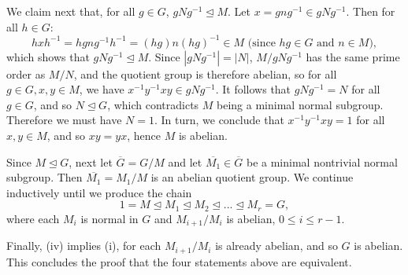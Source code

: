 \documentclass{article}
\begin{document}
We claim next that, for all $g \in G$, $gNg^{-1} \unlhd M$. Let $x = gng^{-1} \in gNg^{-1}$. Then for all $h \in G$:
\begin{equation*}
    hxh^{-1} = hgng^{-1}h^{-1} = (hg)n(hg)^{-1} \in M \text{ (since $hg \in G$ and $n \in M$)},
\end{equation*}
which shows that $gNg^{-1} \unlhd M$. Since $|gNg^{-1}| = |N|$, $M/gNg^{-1}$ has the same prime order as $M/N$, and the quotient group is therefore abelian, so for all $g \in G, x, y \in M$, we have $x^{-1}y^{-1}xy \in gNg^{-1}$. It follows that $gNg^{-1} = N$ for all $g \in G$, and so $N \unlhd G$, which contradicts $M$ being a minimal normal subgroup. Therefore we must have $N = 1$. In turn, we conclude that $x^{-1}y^{-1}xy = 1$ for all $x, y \in M$, and so $xy = yx$, hence $M$ is abelian.

Since $M \unlhd G$, next let $\overline{G} = G/M$ and let $\overline{M_1} \in \overline{G}$ be a minimal nontrivial normal subgroup. Then $\overline{M_1} = M_1/M$ is an abelian quotient group. We continue inductively until we produce the chain
\begin{equation*}
    1 = M \unlhd M_1 \unlhd M_2 \unlhd ... \unlhd M_r = G,
\end{equation*}
where each $M_i$ is normal in $G$ and $M_{i + 1}/M_i$ is abelian, $0 \leq i \leq r - 1$.

Finally, (iv) implies (i), for each $M_{i + 1}/M_i$ is already abelian, and so $G$ is abelian. This concludes the proof that the four statements above are equivalent.
\end{document}
